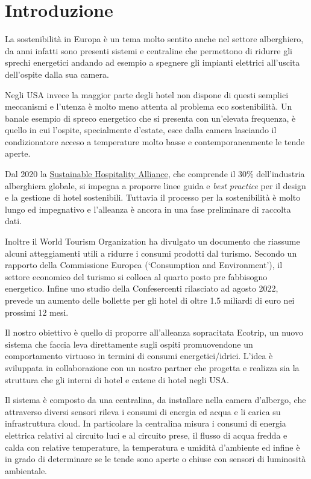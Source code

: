 
\section{Introduzione}

La sostenibilità in Europa è un tema molto sentito anche nel settore alberghiero, da anni infatti sono presenti sistemi e centraline che permettono di ridurre gli sprechi energetici andando ad esempio a spegnere gli impianti elettrici all'uscita dell'ospite dalla sua camera.

Negli USA invece la maggior parte degli hotel non dispone di questi semplici meccanismi e l'utenza è molto meno attenta al problema eco sostenibilità. Un banale esempio di spreco energetico che si presenta con un'elevata frequenza, è quello in cui l'ospite, specialmente d'estate, esce dalla camera lasciando il condizionatore acceso a temperature molto basse e contemporaneamente le tende aperte.

Dal 2020 la \href{https://sustainablehospitalityalliance.org/}{Sustainable Hospitality Alliance}, che comprende il 30\% dell'industria alberghiera globale, si impegna a proporre linee guida e \textit{best practice} per il design e la gestione di hotel sostenibili. Tuttavia il processo per la sostenibilità è molto lungo ed impegnativo e l'alleanza è ancora in una fase preliminare di raccolta dati.

Inoltre il World Tourism Organization ha divulgato un documento che riassume alcuni atteggiamenti utili a ridurre i consumi prodotti dal turismo. Secondo un rapporto della Commissione Europea (‘Consumption and Environment’), il settore economico del turismo si colloca al quarto posto pre fabbisogno energetico. Infine uno studio della Confesercenti rilasciato ad agosto 2022, prevede un aumento delle bollette per gli hotel di oltre 1.5 miliardi di euro nei prossimi 12 mesi.

Il nostro obiettivo è quello di proporre all'alleanza sopracitata Ecotrip, un nuovo sistema che faccia leva direttamente sugli ospiti promuovendone un comportamento virtuoso in termini di consumi energetici/idrici.
L'idea è sviluppata in collaborazione con un nostro partner che progetta e realizza sia la struttura che gli interni di hotel e catene di hotel negli USA.

Il sistema è composto da una centralina, da installare nella camera d'albergo, che attraverso diversi sensori rileva i consumi di energia ed acqua e li carica su infrastruttura cloud.
In particolare la centralina misura i consumi di energia elettrica relativi al circuito luci e al circuito prese, il flusso di acqua fredda e calda con relative temperature,
la temperatura e umidità d'ambiente ed infine è in grado di determinare se le tende sono aperte o chiuse con sensori di luminosità ambientale.

